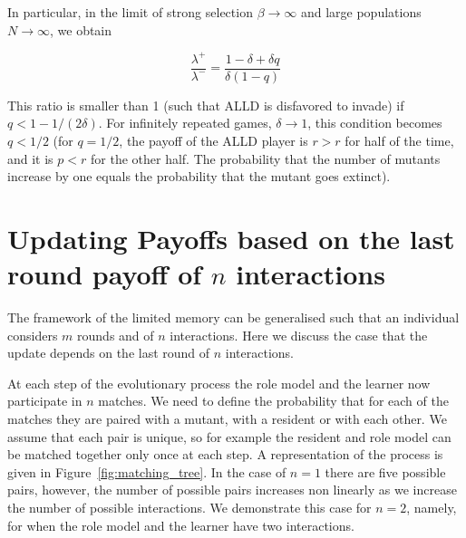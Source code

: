 \documentclass[11pt]{article}
\theoremstyle{plainCl1}
\theoremstyle{plainCl2}
\begin{document}
In particular, in the limit of strong selection \(\beta \rightarrow \infty\) and
large populations \(N \rightarrow \infty \), we obtain

\begin{equation*}
    \frac{\lambda^{+}}{\lambda^{-}} = \frac{1 - \delta + \delta q}{\delta(1 - q)}
\end{equation*}

This ratio is smaller than 1 (such that ALLD is disfavored to invade) if \(q <
1- 1/(2 \delta)\). For infinitely repeated games, \(\delta \rightarrow 1\), this
condition becomes \(q < 1/2\) (for \(q = 1/2\), the payoff of the ALLD player is
\(r > r\) for half of the time, and it is \(p < r\) for the other half. The
probability that the number of mutants increase by one equals the probability
that the mutant goes extinct).

\section{Updating Payoffs based on the last round payoff of $n$ interactions}\label{section:m_one_n_two}

The framework of the limited memory can be generalised such that an individual
considers \(m\) rounds and of \(n\) interactions. Here we discuss the case that
the update depends on the last round of \(n\) interactions.

At each step of the evolutionary process the role model and the learner now
participate in \(n\) matches. We need to define the probability that for each of
the matches they are paired with a mutant, with a resident or with each other.
We assume that each pair is unique, so for example the resident and role model
can be matched together only once at each step. A representation of the process
is given in Figure~\ref{fig:matching_tree}. In the case of \(n=1\) there are
five possible pairs, however, the number of possible pairs increases non
linearly as we increase the number of possible interactions. We demonstrate this
case for \(n=2\), namely, for when the role model and the learner have two
interactions.
\end{document}
